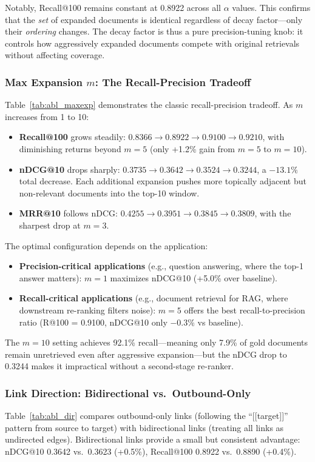 \documentclass[sigconf,review]{acmart}
\begin{document}
Notably, Recall@100 remains constant at 0.8922 across all $\alpha$ values. This
confirms that the \emph{set} of expanded documents is identical regardless of
decay factor---only their \emph{ordering} changes. The decay factor is thus a
pure precision-tuning knob: it controls how aggressively expanded documents
compete with original retrievals without affecting coverage.

\subsubsection{Max Expansion $m$: The Recall-Precision Tradeoff}
Table~\ref{tab:abl_maxexp} demonstrates the classic recall-precision tradeoff.
As $m$ increases from 1 to 10:
\begin{itemize}[leftmargin=*,nosep]
\item \textbf{Recall@100} grows steadily: $0.8366 \to 0.8922 \to 0.9100 \to 0.9210$,
      with diminishing returns beyond $m=5$ (only +1.2\% gain from $m=5$ to $m=10$).
\item \textbf{nDCG@10} drops sharply: $0.3735 \to 0.3642 \to 0.3524 \to 0.3244$,
      a $-13.1\%$ total decrease. Each additional expansion pushes more
      topically adjacent but non-relevant documents into the top-10 window.
\item \textbf{MRR@10} follows nDCG: $0.4255 \to 0.3951 \to 0.3845 \to 0.3809$,
      with the sharpest drop at $m=3$.
\end{itemize}

The optimal configuration depends on the application:
\begin{itemize}[leftmargin=*,nosep]
\item \textbf{Precision-critical applications} (e.g., question answering, where
      the top-1 answer matters): $m=1$ maximizes nDCG@10 (+5.0\% over baseline).
\item \textbf{Recall-critical applications} (e.g., document retrieval for RAG,
      where downstream re-ranking filters noise): $m=5$ offers the best
      recall-to-precision ratio (R@100 = 0.9100, nDCG@10 only $-$0.3\% vs baseline).
\end{itemize}

The $m=10$ setting achieves 92.1\% recall---meaning only 7.9\% of gold documents
remain unretrieved even after aggressive expansion---but the nDCG drop to 0.3244
makes it impractical without a second-stage re-ranker.

\subsubsection{Link Direction: Bidirectional vs.\ Outbound-Only}
Table~\ref{tab:abl_dir} compares outbound-only links (following the ``[[target]]''
pattern from source to target) with bidirectional links (treating all links as
undirected edges). Bidirectional links provide a small but consistent advantage:
nDCG@10 0.3642 vs.\ 0.3623 (+0.5\%), Recall@100 0.8922 vs.\ 0.8890 (+0.4\%).
\end{document}
